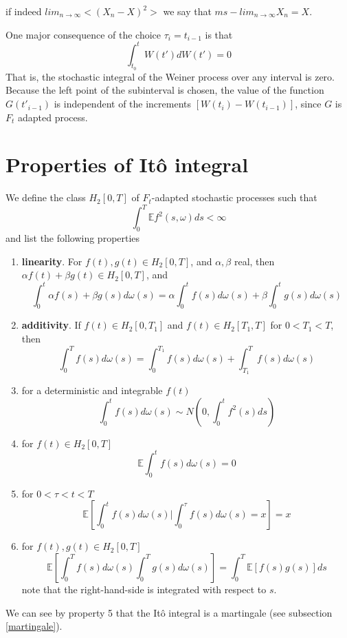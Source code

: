 \documentclass[12pt]{report}
\begin{document}
if indeed $lim_{n\rightarrow \infty}<(X_n-X)^2>$ we say that $ms-lim_{n\rightarrow \infty} X_n=X$.

One major consequence of the choice $\tau_i=t_{i-1}$ is that 
\begin{equation*}
\int_{t_0}^{t}W(t')dW(t')=0
\end{equation*}
That is, the stochastic integral of the Weiner process over any interval is zero.
Because the left point of the subinterval is chosen, the value of the function $G(t'_{i-1})$ is independent of the increments $[W(t_i)-W(t_{i-1})]$, since $G$ is $F_t$ adapted process.

\section{Properties of It\^{o} integral}\label{propertiesOfTheItoIntegral}
We define the class $H_2[0,T]$ of $F_t$-adapted stochastic processes such that 
\begin{equation*}
\int_0^T \mathbb{E}f^2(s,\omega)ds <\infty
\end{equation*}
and list the following properties
\begin{enumerate}
\item \textbf{linearity}. For $f(t),g(t)\in H_2[0,T]$, and $\alpha,\beta$ real, then $\alpha f(t)+\beta g(t) \in H_2[0,T]$, and 
\begin{equation*}
\int_0^t \alpha f(s)+\beta g(s) d\omega(s) = \alpha \int_0^t f(s)d\omega(s) +\beta \int_0^t g(s)d\omega(s)
\end{equation*}
\item \textbf{additivity}. If $f(t)\in H_2[0,T_1]$ and $f(t)\in H_2[T_1,T]$ for $0<T_1<T$, then 
\begin{equation*}
\int_0^Tf(s)d\omega(s) = \int_0^{T_1}f(s)d\omega(s) +\int_{T_1}^T f(s)d\omega(s)
\end{equation*}
\item for a deterministic and integrable $f(t)$
\begin{equation*}
\int_0^t f(s)d\omega(s) \sim N\left(0,\int_0^t f^2(s)ds\right)
\end{equation*}
\item for $f(t)\in H_2[0,T]$
\begin{equation*}
\mathbb{E}\int_0^t f(s)d\omega(s) = 0
\end{equation*}
\item for $0<\tau<t<T$  
\begin{equation*}
\mathbb{E}\left[\int_0^t f(s)d\omega(s)  | \int_0^\tau f(s)d\omega(s)=x \right] =x 
\end{equation*}
\item for $f(t),g(t)\in H_2[0,T]$
\begin{equation*}
\mathbb{E}\left[\int_0^Tf(s)d\omega(s)\int_0^T g(s)d\omega(s)\right]=\int_0^T\mathbb{E}[f(s)g(s)]ds
\end{equation*}
note that the right-hand-side is integrated with respect to $s$.
\end{enumerate}
We can see by property 5 that the It\^{o} integral is a martingale (see subsection \ref{martingale}).
\end{document}
